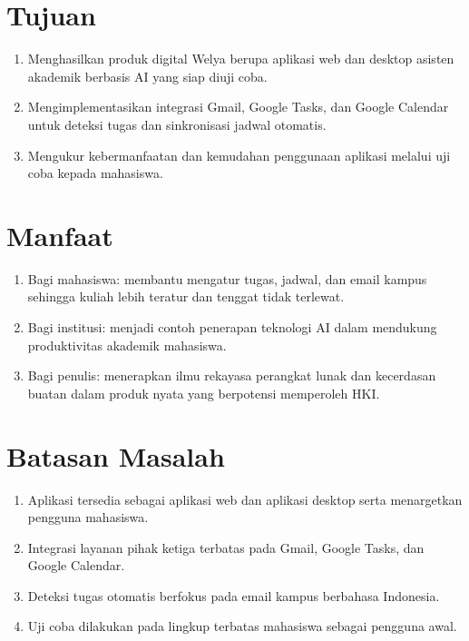 \section{Tujuan}
\begin{enumerate}
  \item Menghasilkan produk digital Welya berupa aplikasi web dan desktop asisten
    akademik berbasis AI yang siap diuji coba.
  \item Mengimplementasikan integrasi Gmail, Google Tasks, dan Google
    Calendar untuk deteksi tugas dan sinkronisasi jadwal otomatis.
  \item Mengukur kebermanfaatan dan kemudahan penggunaan aplikasi melalui
    uji coba kepada mahasiswa.
\end{enumerate}

\section{Manfaat}
\begin{enumerate}
  \item Bagi mahasiswa: membantu mengatur tugas, jadwal, dan email kampus
    sehingga kuliah lebih teratur dan tenggat tidak terlewat.
  \item Bagi institusi: menjadi contoh penerapan teknologi AI dalam
    mendukung produktivitas akademik mahasiswa.
  \item Bagi penulis: menerapkan ilmu rekayasa perangkat lunak dan
    kecerdasan buatan dalam produk nyata yang berpotensi memperoleh
    HKI.
\end{enumerate}

\section{Batasan Masalah}
\begin{enumerate}
  \item Aplikasi tersedia sebagai aplikasi web dan aplikasi desktop
    serta menargetkan pengguna mahasiswa.
  \item Integrasi layanan pihak ketiga terbatas pada Gmail, Google Tasks,
    dan Google Calendar.
  \item Deteksi tugas otomatis berfokus pada email kampus berbahasa
    Indonesia.
  \item Uji coba dilakukan pada lingkup terbatas mahasiswa sebagai
    pengguna awal.
\end{enumerate}
